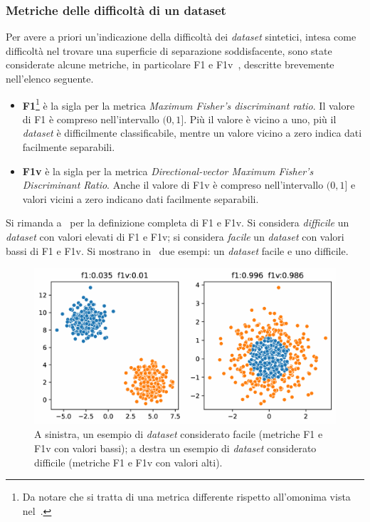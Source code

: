 \subsubsection{Metriche delle difficoltà di un dataset}\label{sec:metriche_dataset}
Per avere a priori un'indicazione della difficoltà dei \emph{dataset} sintetici, intesa come difficoltà nel trovare una superficie di separazione soddisfacente, sono state considerate alcune metriche, in particolare F1 e F1v~\cite{ds_complexity}, descritte brevemente nell'elenco seguente.
\begin{itemize}
    \item \textbf{F1}\footnote{Da notare che si tratta di una metrica differente rispetto all'omonima vista nel~.} è la sigla per la metrica \emph{Maximum Fisher’s discriminant ratio}.
    Il valore di F1 è compreso nell'intervallo $(0,1]$. Più il valore è vicino a uno, più il \emph{dataset} è difficilmente classificabile, mentre un valore vicino a zero indica dati facilmente separabili.
    \item \textbf{F1v} è la sigla per la metrica \emph{Directional-vector Maximum Fisher’s Discriminant Ratio}. 
    Anche il valore di F1v è compreso nell'intervallo $(0,1]$ e valori vicini a zero indicano dati facilmente separabili.    
\end{itemize}
Si rimanda a~\cite{ds_complexity} per la definizione completa di F1 e F1v.
Si considera \emph{difficile} un \emph{dataset} con valori elevati di F1 e F1v; si considera \emph{facile} un \emph{dataset} con valori bassi di F1 e F1v.
Si mostrano in~ due esempi: un \emph{dataset} facile e uno difficile.
\begin{figure}
    \centering
    \includegraphics[width=.8\textwidth]{img/dataset_facile_difficile.pdf}
    \caption[Esempio della ``difficoltà'' di un \emph{dataset}.]{A sinistra, un esempio di \emph{dataset} considerato facile (metriche F1 e F1v con valori bassi); a destra un esempio di \emph{dataset} considerato difficile (metriche F1 e F1v con valori alti).}
    \label{fig:esempio_ds_facile_difficile}
\end{figure}

